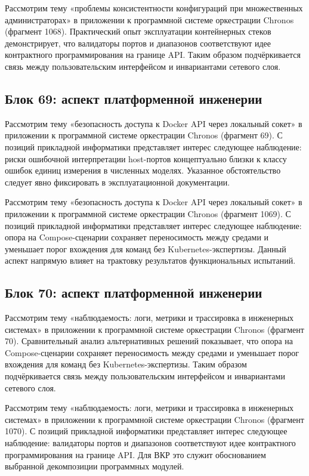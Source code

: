  Рассмотрим тему «проблемы консистентности конфигураций при множественных администраторах» в приложении к программной системе оркестрации Chronos (фрагмент 1068). Практический опыт эксплуатации контейнерных стеков демонстрирует, что валидаторы портов и диапазонов соответствуют идее контрактного программирования на границе API. Таким образом подчёркивается связь между пользовательским интерфейсом и инвариантами сетевого слоя.

\subsection{Блок 69: аспект платформенной инженерии}
 Рассмотрим тему «безопасность доступа к Docker API через локальный сокет» в приложении к программной системе оркестрации Chronos (фрагмент 69). С позиций прикладной информатики представляет интерес следующее наблюдение: риски ошибочной интерпретации host-портов концептуально близки к классу ошибок единиц измерения в численных моделях. Указанное обстоятельство следует явно фиксировать в эксплуатационной документации.

 Рассмотрим тему «безопасность доступа к Docker API через локальный сокет» в приложении к программной системе оркестрации Chronos (фрагмент 1069). С позиций прикладной информатики представляет интерес следующее наблюдение: опора на Compose-сценарии сохраняет переносимость между средами и уменьшает порог вхождения для команд без Kubernetes-экспертизы. Данный аспект напрямую влияет на трактовку результатов функциональных испытаний.

\subsection{Блок 70: аспект платформенной инженерии}
 Рассмотрим тему «наблюдаемость: логи, метрики и трассировка в инженерных системах» в приложении к программной системе оркестрации Chronos (фрагмент 70). Сравнительный анализ альтернативных решений показывает, что опора на Compose-сценарии сохраняет переносимость между средами и уменьшает порог вхождения для команд без Kubernetes-экспертизы. Таким образом подчёркивается связь между пользовательским интерфейсом и инвариантами сетевого слоя.

 Рассмотрим тему «наблюдаемость: логи, метрики и трассировка в инженерных системах» в приложении к программной системе оркестрации Chronos (фрагмент 1070). С позиций прикладной информатики представляет интерес следующее наблюдение: валидаторы портов и диапазонов соответствуют идее контрактного программирования на границе API. Для ВКР это служит обоснованием выбранной декомпозиции программных модулей.

